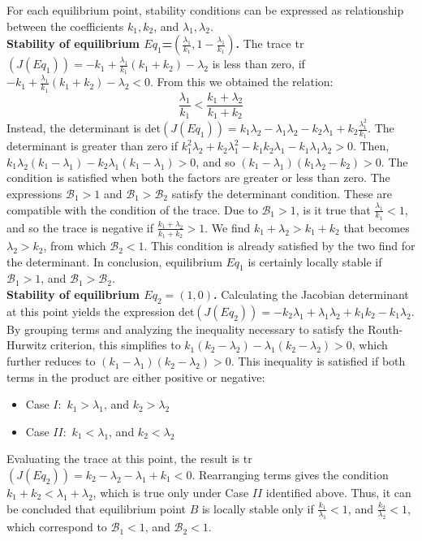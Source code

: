 For each equilibrium point, stability conditions can be expressed as relationship between the coefficients $k_1, k_2$, and $\lambda_1, \lambda_2$.\\

\noindent\textbf{Stability of equilibrium $Eq_1$=$(\frac{\lambda_1}{k_1}, 1-\frac{\lambda_1}{k_1})$.} The trace tr$(J(Eq_1)) = - k_1 + \frac{\lambda_1}{k_1}(k_1+k_2) - \lambda_2$ is  less than zero, if $-k_1 + \frac{\lambda_1}{k_1}( k_1 + k_2) - \lambda_2 < 0$. From this we obtained the relation:
\[\frac{\lambda_1}{k_1} < \frac{k_1 + \lambda_2}{k_1 + k_2} \]
Instead, the determinant is det$(J(Eq_1)) = k_1 \lambda_2 - \lambda_1 \lambda_2 -k_2 \lambda_1 + k_2 \frac{\lambda_1^2}{k_1}$. The determinant is greater than zero if $k_1^2 \lambda_2+ k_2 \lambda_1^2 - k_1 k_2 \lambda_1 -k_1 \lambda_1 \lambda_2 > 0$. Then, $k_1 \lambda_2(k_1 -\lambda_1) - k_2 \lambda_1 (k_1 - \lambda_1) > 0$, and so $(k_1 - \lambda_1)(k_1 \lambda_2 - k_2) > 0$. The condition is satisfied when both the factors are greater or less than zero. The expressions $\mathcal{B}_1 > 1$ and $\mathcal{B}_1 > \mathcal{B}_2$ satisfy the determinant condition.
These are compatible with the condition of the trace.
Due to $\mathcal{B}_1 > 1$, is it true that $\frac{\lambda_1}{k_1} < 1$, and so the trace is negative if $\frac{k_1 + \lambda_2}{k_1 + k_2} > 1$. We find $k_1 + \lambda_2 > k_1 + k_2$ that becomes  $\lambda_2 > k_2$, from which $\mathcal{B}_2 < 1$. This condition is already satisfied by the two find for the determinant. %
In conclusion, equilibrium $Eq_1$ is certainly locally stable if $\mathcal{B}_1 > 1$, and $\mathcal{B}_1 > \mathcal{B}_2$.\\ 
 
\noindent\textbf{Stability of equilibrium $Eq_2=(1,0)$.} Calculating the Jacobian determinant at this point yields the expression det$(J(Eq_2))= - k_2 \lambda_1 + \lambda_1 \lambda_2 + k_1 k_2 - k_1 \lambda_2$. By grouping terms and analyzing the inequality necessary to satisfy the Routh-Hurwitz criterion, this simplifies to $k_1 (k_2 - \lambda_2) - \lambda_1(k_2 - \lambda_2) > 0$, which further reduces to $(k_1 - \lambda_1) (k_2 - \lambda_2) >0$.
This inequality is satisfied if both terms in the product are either positive or negative:
\begin{itemize}
	\item Case $I:$ $k_1 > \lambda_1$, and $k_2 > \lambda_2$
	\item Case $II:$ $k_1 < \lambda_1$, and $k_2 < \lambda_2$
\end{itemize}
Evaluating the trace at this point, the result is tr$(J(Eq_2)) = k_2 - \lambda_2 - \lambda_1 + k_1 < 0 $. Rearranging terms gives the condition $k_1 + k_2 < \lambda_1 + \lambda_2$, which is true only under Case $II$ identified above. 
Thus, it can be concluded that equilibrium point $B$ is locally stable only if $\frac{k_1}{\lambda_1} <1$, and  $\frac{k_2}{\lambda_2} <1$, which correspond to $\mathcal{B}_1 < 1$, and $\mathcal{B}_2 <1$.\\

